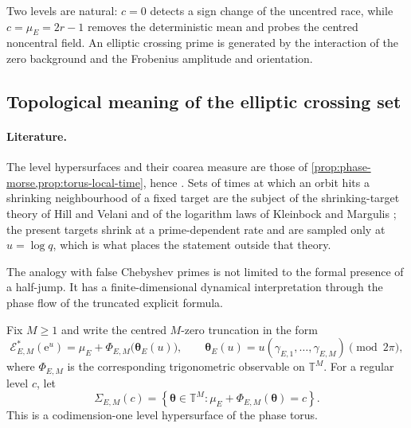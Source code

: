 \documentclass[11pt,reqno]{amsart}
\theoremstyle{remark}
\newcommand{\T}{\mathbb{T}}
\newcommand{\e}{\mathrm{e}}
\begin{document}
Two levels are natural: $c=0$ detects a sign change of the uncentred race, while $c=\mu_E=2r-1$ removes the deterministic mean and probes the centred noncentral field.  An elliptic crossing prime is generated by the interaction of the zero background and the Frobenius amplitude and orientation.

\subsection{Topological meaning of the elliptic crossing set}
\label{subsec:crossing-topology}

\paragraph{Literature.}
The level hypersurfaces and their coarea measure are those of \cref{prop:phase-morse,prop:torus-local-time}, hence \cite{Milnor1963,Federer1969}.  Sets of times at which an orbit hits a shrinking neighbourhood of a fixed target are the subject of the shrinking-target theory of Hill and Velani \cite{HillVelani1995} and of the logarithm laws of Kleinbock and Margulis \cite{KleinbockMargulis1999}; the present targets shrink at a prime-dependent rate and are sampled only at $u=\log q$, which is what places the statement outside that theory.

The analogy with false Chebyshev primes is not limited to the
formal presence of a half-jump.  It has a finite-dimensional
dynamical interpretation through the phase flow of the truncated
explicit formula.

Fix $M\geq 1$ and write the centred $M$-zero truncation in the form
\begin{equation}
  \mathcal E^{*}_{E,M}(\e^u)
  =
  \mu_E+\Phi_{E,M}\bigl(\boldsymbol\theta_E(u)\bigr),
  \qquad
  \boldsymbol\theta_E(u)
  =
  u(\gamma_{E,1},\ldots,\gamma_{E,M})
  \pmod{2\pi},
  \label{eq:crossing-phase-flow}
\end{equation}
where $\Phi_{E,M}$ is the corresponding trigonometric observable on
$\T^M$.  For a regular level $c$, let
\begin{equation}
  \Sigma_{E,M}(c)
  =
  \left\{
  \boldsymbol\theta\in\T^M:
  \mu_E+\Phi_{E,M}(\boldsymbol\theta)=c
  \right\}.
  \label{eq:crossing-level-hypersurface}
\end{equation}
This is a codimension-one level hypersurface of the phase torus.
\end{document}
